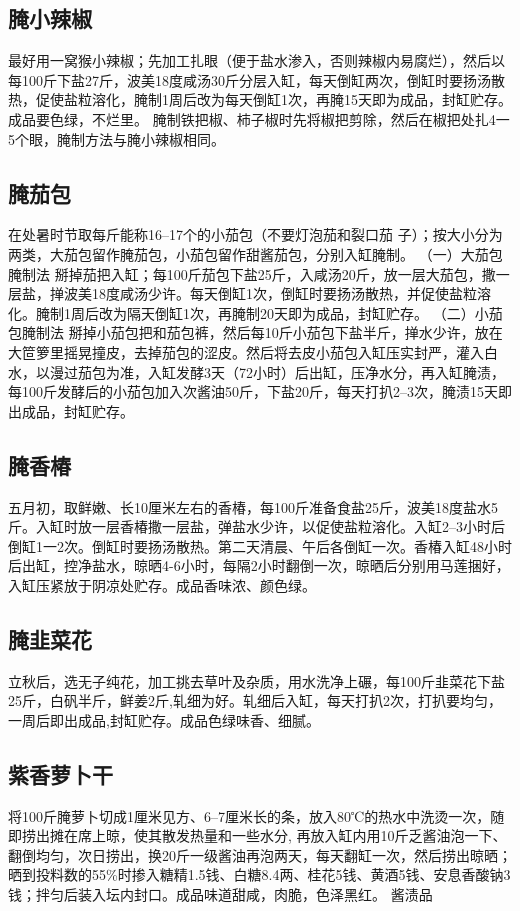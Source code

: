 \documentclass{ctexbook}
\begin{document}
\subsection{腌小辣椒}
最好用一窝猴小辣椒；先加工扎眼（便于盐水渗入，否则辣椒内易腐烂），然后以每100斤下盐27斤，波美18度咸汤30斤分层入缸，每天倒缸两次，倒缸时要扬汤散热，促使盐粒溶化，腌制1周后改为每天倒缸1次，再腌15天即为成品，封缸贮存。成品要色绿，不烂里。
腌制铁把椒、柿子椒时先将椒把剪除，然后在椒把处扎4一5个眼，腌制方法与腌小辣椒相同。
\subsection{腌茄包}
在处暑时节取每斤能称16--17个的小茄包（不要灯泡茄和裂口茄
子）；按大小分为两类，大茄包留作腌茄包，小茄包留作甜酱茄包，分别入缸腌制。
（一）大茄包腌制法
掰掉茄把入缸；每100斤茄包下盐25斤，入咸汤20斤，放一层大茄包，撒一层盐，掸波美18度咸汤少许。每天倒缸1次，倒缸时要扬汤散热，并促使盐粒溶化。腌制1周后改为隔天倒缸1次，再腌制20天即为成品，封缸贮存。
（二）小茄包腌制法
掰掉小茄包把和茄包裤，然后每10斤小茄包下盐半斤，掸水少许，放在大笸箩里摇晃撞皮，去掉茄包的涩皮。然后将去皮小茄包入缸压实封严，灌入白水，以漫过茄包为准，入缸发酵3天（72小时）后出缸，压净水分，再入缸腌渍，每100斤发酵后的小茄包加入次酱油50斤，下盐20斤，每天打扒2--3次，腌渍15天即出成品，封缸贮存。
\subsection{腌香椿}
五月初，取鲜嫩、长10厘米左右的香椿，每100斤准备食盐25斤，波美18度盐水5斤。入缸时放一层香椿撒一层盐，弹盐水少许，以促使盐粒溶化。入缸2--3小时后倒缸1一2次。倒缸时要扬汤散热。第二天清晨、午后各倒缸一次。香椿入缸48小时后出缸，控净盐水，晾晒4-6小时，每隔2小时翻倒一次，晾晒后分别用马莲捆好，入缸压紧放于阴凉处贮存。成品香味浓、颜色绿。
\subsection{腌韭菜花}
立秋后，选无子纯花，加工挑去草叶及杂质，用水洗净上碾，每100斤韭菜花下盐25斤，白矾半斤，鲜姜2斤,轧细为好。轧细后入缸，每天打扒2次，打扒要均匀，一周后即出成品,封缸贮存。成品色绿味香、细腻。
\subsection{紫香萝卜干}
将100斤腌萝卜切成1厘米见方、6--7厘米长的条，放入80℃的热水中洗烫一次，随即捞出摊在席上晾，使其散发热量和一些水分,
再放入缸内用10斤乏酱油泡一下、翻倒均匀，次日捞出，换20斤一级酱油再泡两天，每天翻缸一次，然后捞出晾晒；晒到投料数的55\%时掺入糖精1.5钱、白糖8.4两、桂花5钱、黄酒5钱、安息香酸钠3钱；拌匀后装入坛内封口。成品味道甜咸，肉脆，色泽黑红。
酱渍品
\end{document}
